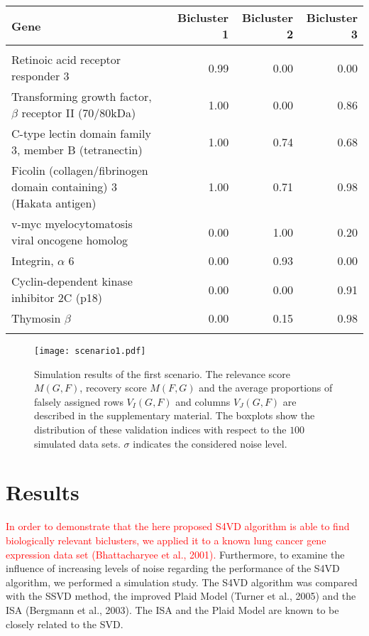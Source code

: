 \documentclass{bioinfo}
\begin{document}
\begin{flushleft}
 \begin{table*}[t]
{\begin{tabular}{lrrrr}\toprule
Gene & \hspace{4 cm} & Bicluster 1 & Bicluster 2 & Bicluster 3 \\[4pt] 
\hline\\[-4pt]
Retinoic acid receptor responder 3 & & 0.99 & 0.00 & 0.00 \\ 
Transforming growth factor, $\beta$ receptor II (70/80kDa) & & 1.00 & 0.00 & 0.86 \\ 
C-type lectin domain family 3, member B (tetranectin) & & 1.00 & 0.74 & 0.68 \\ 
Ficolin (collagen/fibrinogen domain containing) 3 (Hakata antigen) & &1.00 & 0.71 & 0.98 \\ 
v-myc myelocytomatosis viral oncogene homolog & &0.00 & 1.00 & 0.20 \\ 
Integrin, $\alpha$ 6 & &0.00 & 0.93 & 0.00 \\ 
Cyclin-dependent kinase inhibitor 2C (p18) & &0.00 & 0.00 & 0.91 \\ 
Thymosin $\beta$ & &0.00 & 0.15 & 0.98 \\   
\botrule 
\end{tabular}}{}%
\end{table*}
\end{flushleft}
\begin{center}
\begin{figure*}[t]
\texttt{[image: scenario1.pdf]}
\caption{ Simulation results of the first scenario. The relevance score $M(G,F)$, recovery score $M(F,G)$ and the average proportions of falsely assigned rows $V_{I}(G,F)$ and columns $V_{J}(G,F)$ are described in the supplementary material. The boxplots show the distribution of these validation indices with respect to the $100$ simulated data sets. $\sigma$ indicates the considered noise level.\label{fig:02} 
}
\end{figure*}
\end{center}
\vspace{-1.5 cm}
\section{Results}
\textcolor{red}{In order to demonstrate that the here proposed S4VD algorithm is able to find biologically relevant biclusters, we applied it to a known lung cancer gene expression data set (Bhattacharyee et al., 2001)\nocite{Bhattacharjee2001}.} Furthermore, to examine the influence of increasing levels of noise regarding the performance of the S4VD algorithm, we performed a simulation study. The S4VD algorithm was compared with the SSVD method, the improved Plaid Model (Turner et al., 2005) and the ISA (Bergmann et al., 2003). The ISA and the Plaid Model are known to be closely related to the SVD.  
\end{document}
